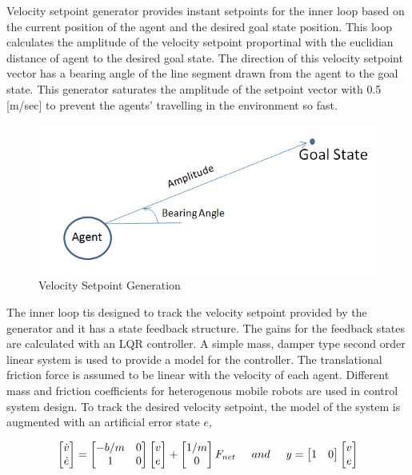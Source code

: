 Velocity setpoint generator provides instant setpoints for the inner loop based on the current position of the agent and the desired goal state position.  This loop calculates the amplitude of the velocity setpoint proportinal with the euclidian distance of agent to the desired goal state. The direction of this velocity setpoint vector has a bearing angle of the line segment drawn from the agent to the goal state. This generator saturates the amplitude of the setpoint vector with 0.5 [m/sec] to prevent the agents' travelling in the environment so fast. 

\begin{figure}[H]
\caption{Velocity Setpoint Generation}
\centering
\includegraphics[scale = 0.50]{bearing}
\end{figure}

The inner loop tis designed to track the velocity setpoint provided by the generator and it has a state feedback structure. The gains for the feedback states are calculated with an LQR controller. A simple mass, damper type second order linear system is used to provide a model for the controller. The translational friction force is assumed to be linear with the velocity of each agent. Different mass and friction coefficients for heterogenous mobile robots are used in control system design. To track the desired velocity setpoint, the model of the system is augmented with an artificial error state $e$,

\begin{equation} \label{dynamic_system}
\begin{bmatrix}
\dot{v} \\ \dot{e}
\end{bmatrix}
=
\begin{bmatrix}
-b/m & 0 \\
1 & 0
\end{bmatrix}
\begin{bmatrix}
v \\ e
\end{bmatrix}
+ \begin{bmatrix}
1/m \\ 0
\end{bmatrix}
F_{net} \hspace{0.5cm} and
\hspace{0.5cm}
y = \begin{bmatrix}
1 & 0
\end{bmatrix}
\begin{bmatrix}
v \\ e
\end{bmatrix}
\end{equation}

